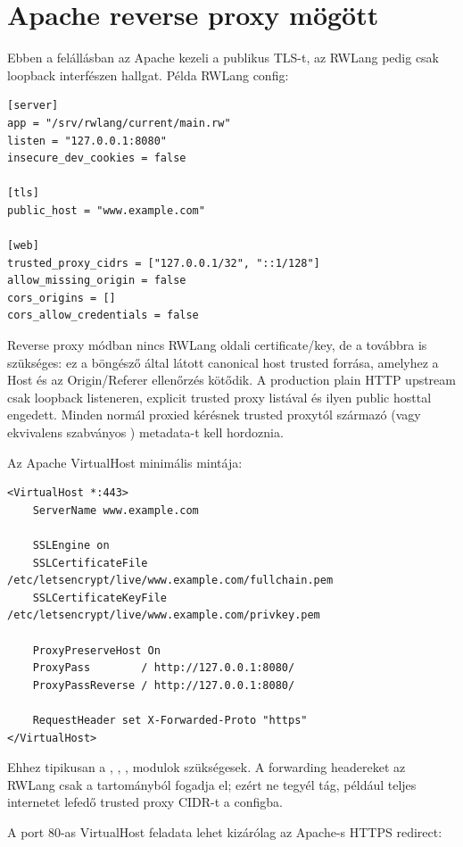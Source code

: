 \section{Apache reverse proxy mögött}

Ebben a felállásban az Apache kezeli a publikus TLS-t, az RWLang pedig csak loopback interfészen hallgat. Példa RWLang config:

\begin{lstlisting}
[server]
app = "/srv/rwlang/current/main.rw"
listen = "127.0.0.1:8080"
insecure_dev_cookies = false

[tls]
public_host = "www.example.com"

[web]
trusted_proxy_cidrs = ["127.0.0.1/32", "::1/128"]
allow_missing_origin = false
cors_origins = []
cors_allow_credentials = false
\end{lstlisting}

Reverse proxy módban nincs RWLang oldali certificate/key, de a  továbbra is szükséges: ez a böngésző által látott canonical host trusted forrása, amelyhez a Host és az Origin/Referer ellenőrzés kötődik. A production plain HTTP upstream csak loopback listeneren, explicit trusted proxy listával és ilyen public hosttal engedett. Minden normál proxied kérésnek trusted proxytól származó  (vagy ekvivalens szabványos ) metadata-t kell hordoznia.

Az Apache VirtualHost minimális mintája:

\begin{lstlisting}
<VirtualHost *:443>
    ServerName www.example.com

    SSLEngine on
    SSLCertificateFile /etc/letsencrypt/live/www.example.com/fullchain.pem
    SSLCertificateKeyFile /etc/letsencrypt/live/www.example.com/privkey.pem

    ProxyPreserveHost On
    ProxyPass        / http://127.0.0.1:8080/
    ProxyPassReverse / http://127.0.0.1:8080/

    RequestHeader set X-Forwarded-Proto "https"
</VirtualHost>
\end{lstlisting}

Ehhez tipikusan a , , ,  modulok szükségesek. A forwarding headereket az RWLang csak a  tartományból fogadja el; ezért ne tegyél tág, például teljes internetet lefedő trusted proxy CIDR-t a configba.

A port 80-as VirtualHost feladata lehet kizárólag az Apache-s HTTPS redirect:

